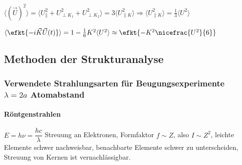 $\langle (\vec{U})^{2}\rangle =\langle U_{\parallel}^{2}+U_{\perp K_{1}}^{2}+U_{\perp K_{2}}^{2}\rangle =3\langle U_{\parallel K}^{2}\rangle \Rightarrow\langle U_{\parallel K}^{2}\rangle =\frac{1}{3}\langle U^{2}\rangle $

$\langle \efkt{-i\vec{K}\vec{U}(t)}\rangle =1-\frac{1}{6}K^{2}\langle U^{2}\rangle \approx\efkt{-K^{2}\nicefrac{U^{2}}{6}}$

%


\subsection{Methoden der Strukturanalyse}

\renewcommand{\thesubsubsection}{\alph{subsubsection}) } 


\subsubsection{Verwendete Strahlungsarten f\"ur Beugungsexperimente $\lambda=2a$
Atomabstand}


\paragraph{R\"ontgenstrahlen}

$E=h\nu=\dfrac{hc}{\lambda}$ Streuung an Elektronen, Formfaktor $f\sim Z$,
also $I\sim Z^{2}$, leichte Elemente schwer nachweisbar, benachbarte
Elemente schwer zu unterscheiden, Streuung von Kernen ist vernachl\"assigbar.

